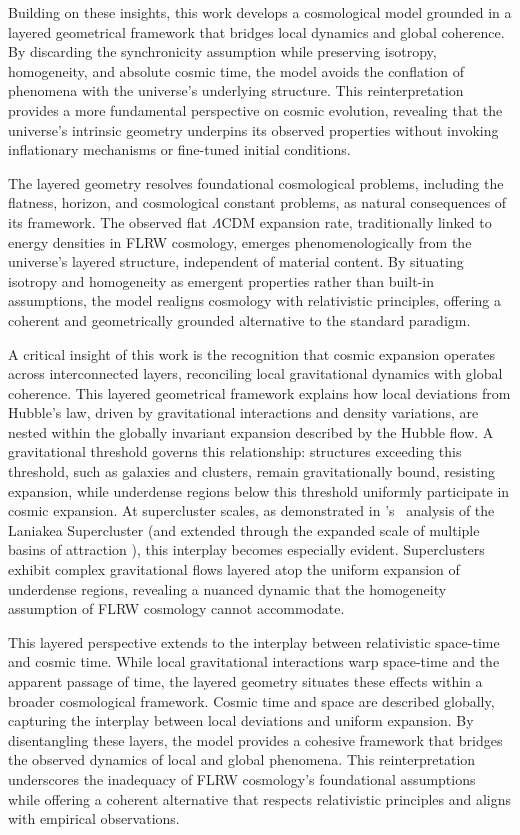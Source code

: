 \documentclass[aps,rmp,groupedaddress,twocolumn,10pt]{revtex4-2}
\begin{document}
Building on these insights, this work develops a cosmological model grounded in a layered geometrical framework that bridges local dynamics and global coherence. By discarding the synchronicity assumption while preserving isotropy, homogeneity, and absolute cosmic time, the model avoids the conflation of phenomena with the universe's underlying structure. This reinterpretation provides a more fundamental perspective on cosmic evolution, revealing that the universe's intrinsic geometry underpins its observed properties without invoking inflationary mechanisms or fine-tuned initial conditions.

The layered geometry resolves foundational cosmological problems, including the flatness, horizon, and cosmological constant problems, as natural consequences of its framework. The observed flat $\Lambda$CDM expansion rate, traditionally linked to energy densities in FLRW cosmology, emerges phenomenologically from the universe's layered structure, independent of material content. By situating isotropy and homogeneity as emergent properties rather than built-in assumptions, the model realigns cosmology with relativistic principles, offering a coherent and geometrically grounded alternative to the standard paradigm.

A critical insight of this work is the recognition that cosmic expansion operates across interconnected layers, reconciling local gravitational dynamics with global coherence. This layered geometrical framework explains how local deviations from Hubble's law, driven by gravitational interactions and density variations, are nested within the globally invariant expansion described by the Hubble flow. A gravitational threshold governs this relationship: structures exceeding this threshold, such as galaxies and clusters, remain gravitationally bound, resisting expansion, while underdense regions below this threshold uniformly participate in cosmic expansion. At supercluster scales, as demonstrated in \citeauthor{Tully2014}'s~\citeyearpar{Tully2014} analysis of the Laniakea Supercluster (and extended through the expanded scale of multiple basins of attraction \cite{Valade2024}), this interplay becomes especially evident. Superclusters exhibit complex gravitational flows layered atop the uniform expansion of underdense regions, revealing a nuanced dynamic that the homogeneity assumption of FLRW cosmology cannot accommodate.

This layered perspective extends to the interplay between relativistic space-time and cosmic time. While local gravitational interactions warp space-time and the apparent passage of time, the layered geometry situates these effects within a broader cosmological framework. Cosmic time and space are described globally, capturing the interplay between local deviations and uniform expansion. By disentangling these layers, the model provides a cohesive framework that bridges the observed dynamics of local and global phenomena. This reinterpretation underscores the inadequacy of FLRW cosmology's foundational assumptions while offering a coherent alternative that respects relativistic principles and aligns with empirical observations.
\end{document}
